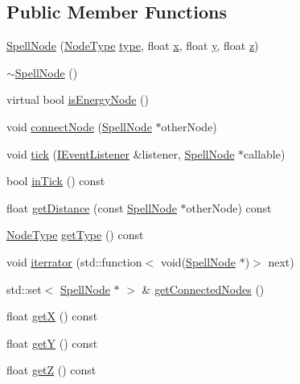 \subsection*{Public Member Functions}
\begin{DoxyCompactItemize}
\item 
\hyperlink{class_spell_node_a131e6e5862945a8371fffcf907603f23}{Spell\-Node} (\hyperlink{_spell_node_8hpp_acac9cbaeea226ed297804c012dc12b16}{Node\-Type} \hyperlink{class_spell_node_ae897f4f135608a9c71948b5f703aeb99}{type}, float \hyperlink{class_spell_node_a916f2a709a674dd2a61530b6acc339cc}{x}, float \hyperlink{class_spell_node_a754d80fd0fd82dbc12443b5f277b9fb4}{y}, float \hyperlink{class_spell_node_aff090331ff1bd816a22e974a50c1a180}{z})
\item 
\hyperlink{class_spell_node_a30bca8b90baeb81361db17ed3f712f7a}{$\sim$\-Spell\-Node} ()
\item 
virtual bool \hyperlink{class_spell_node_aa697b780e010dea8deb78eae8f61e36f}{is\-Energy\-Node} ()
\item 
void \hyperlink{class_spell_node_a66ea41a0a12d0dd8a2ac4eb0c5b1e046}{connect\-Node} (\hyperlink{class_spell_node}{Spell\-Node} $\ast$other\-Node)
\item 
void \hyperlink{class_spell_node_a1286f427e4386e3524ce6914b22a94fb}{tick} (\hyperlink{class_i_event_listener}{I\-Event\-Listener} \&listener, \hyperlink{class_spell_node}{Spell\-Node} $\ast$callable)
\item 
bool \hyperlink{class_spell_node_a711b368a0e285c644737c6f53f641a6f}{in\-Tick} () const 
\item 
float \hyperlink{class_spell_node_ad5fb7d9576d5ea948cbb0451387df7aa}{get\-Distance} (const \hyperlink{class_spell_node}{Spell\-Node} $\ast$other\-Node) const 
\item 
\hyperlink{_spell_node_8hpp_acac9cbaeea226ed297804c012dc12b16}{Node\-Type} \hyperlink{class_spell_node_aba3a1891696bb331002148ba15dc72c3}{get\-Type} () const 
\item 
void \hyperlink{class_spell_node_aac7571c9caae433a697b94d29a6468fa}{iterrator} (std\-::function$<$ void(\hyperlink{class_spell_node}{Spell\-Node} $\ast$)$>$ next)
\item 
std\-::set$<$ \hyperlink{class_spell_node}{Spell\-Node} $\ast$ $>$ \& \hyperlink{class_spell_node_a2dfb0810e266ab201cd0fb5023d3bcc4}{get\-Connected\-Nodes} ()
\item 
float \hyperlink{class_spell_node_ab9c6d7ecd9668f1351648d2f8ce01a0f}{get\-X} () const 
\item 
float \hyperlink{class_spell_node_a6a78fbac60b94cff6ed1aa004ad3c703}{get\-Y} () const 
\item 
float \hyperlink{class_spell_node_ae018717cbd4b78897dedb585a5e40dfd}{get\-Z} () const 
\end{DoxyCompactItemize}
